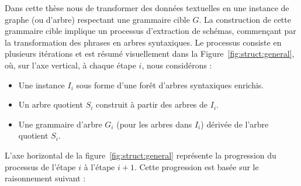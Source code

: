 Dans cette thèse nous de transformer des données textuelles en une instance de graphe (ou d'arbre) respectant une grammaire cible $G$.
La construction de cette grammaire cible implique un processus d'extraction de schémas, commençant par la transformation des phrases en arbres syntaxiques.
Le processus consiste en plusieurs itérations et est résumé visuellement dans la Figure~\ref{fig:struct:general}, où, sur l'axe vertical, à chaque étape $i$, nous considérons :
\begin{itemize}
    \item Une instance $I_i$ sous forme d'une forêt d'arbres syntaxiques enrichis.
    \item Un arbre quotient $S_i$ construit à partir des arbres de $I_i$.
    \item Une grammaire d'arbre $G_{i}$ (pour les arbres dans $I_i$) dérivée de l'arbre quotient $S_i$.
\end{itemize}

L'axe horizontal de la figure~\ref{fig:struct:general} représente la progression du processus de l'étape $i$ à l'étape $i+1$. Cette progression est basée sur le raisonnement suivant :


